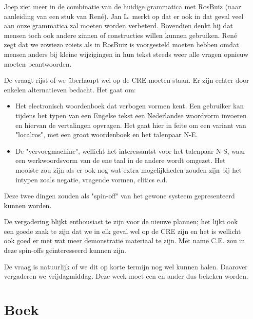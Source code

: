 Joep ziet meer in de combinatie van de huidige grammatica met RosBuiz (naar
aanleiding van een stuk van Ren\'{e}). 
Jan L. merkt op dat er ook in dat geval veel
aan onze grammatica zal moeten worden verbeterd. Bovendien denkt hij dat mensen
toch ook andere zinnen of constructies willen kunnen gebruiken. Ren\'{e} 
zegt dat
we zowiezo zoiets als in RosBuiz is voorgesteld moeten hebben omdat mensen 
anders bij kleine wijzigingen in hun tekst steeds weer alle vragen opnieuw
moeten beantwoorden.

De vraagt rijst of we \"{u}berhaupt wel op de CRE moeten staan. Er zijn 
echter door enkelen alternatieven bedacht. Het gaat om:
\begin{itemize}
  \item Het electronisch woordenboek dat verbogen vormen kent. Een gebruiker
        kan tijdens het typen van een Engelse tekst een Nederlandse woordvorm 
        invoeren en hiervan de vertalingen opvragen. Het gaat hier in feite om
        een variant van "localros", met een groot woordenboek en het talenpaar
        N-E.
  \item De "vervoegmachine", wellicht het interessantst voor het talenpaar N-S,
        waar een werkwoordsvorm van de ene taal in de andere wordt omgezet.
        Het mooiste zou zijn als er ook nog wat extra mogelijkheden zouden zijn
        bij het intypen zoals negatie, vragende vormen, clitics e.d.
\end{itemize}

Deze twee dingen zouden als "spin-off" van het gewone systeem gepresenteerd 
kunnen worden. 

De vergadering blijkt enthousiast te zijn voor de nieuwe plannen; het lijkt
ook een goede zaak te zijn dat we in elk geval wel op de CRE zijn en het is 
wellicht ook goed er met wat meer demonstratie materiaal te zijn. Met name 
C.E. zou in deze spin-offs ge\"{\i}nteresseerd kunnen zijn.

De vraag is natuurlijk of we dit op korte termijn nog wel kunnen halen.
Daarover vergaderen we vrijdagmiddag. Deze week moet een en ander dus bekeken
worden.

\section{Boek}

